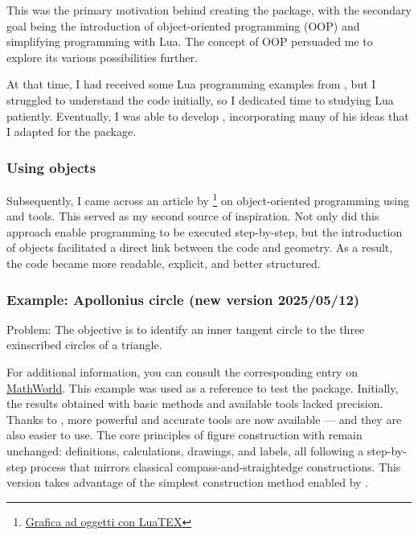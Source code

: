 This was the primary motivation behind creating the package, with the secondary goal being the introduction of object-oriented programming (OOP) and simplifying programming with Lua. The concept of OOP persuaded me to explore its various possibilities further.

At that time, I had received some Lua programming examples from {}, but I struggled to understand the code initially, so I dedicated time to studying Lua patiently. Eventually, I was able to develop \tkzname{\tkznameofpack}, incorporating many of his ideas that I adapted for the package.

\subsubsection{Using objects}
Subsequently, I came across an article by \footnote{\href{https://www.guitex.org/home/images/meeting2012/slides/presentazione_giacomell_guitmeeting_2012.pdf}{Grafica ad oggetti con LuaTEX}}  on object-oriented programming using  and \tkzNamePack{\TIKZ} tools. This served as my second source of inspiration.   Not only did this approach enable programming to be executed step-by-step, but the introduction of objects facilitated a direct link between the code and geometry. As a result, the code became more readable, explicit, and better structured.


\subsubsection{Example: Apollonius circle (new version 2025/05/12)}
\label{ssub:example_apollonius_circle}

\begin{mybox}{Problem:}
The objective is to identify an inner tangent circle to the three exinscribed circles of a triangle.\end{mybox}


For additional information, you can consult the corresponding entry on \href{https://mathworld.wolfram.com/ApolloniusCircle.html}{MathWorld}.
This example was used as a reference to test the  package. Initially, the results obtained with basic methods and available tools lacked precision. Thanks to , more powerful and accurate tools are now available — and they are also easier to use.
The core principles of figure construction with  remain unchanged: definitions, calculations, drawings, and labels, all following a step-by-step process that mirrors classical compass-and-straightedge constructions.
This version takes advantage of the simplest construction method enabled by .



